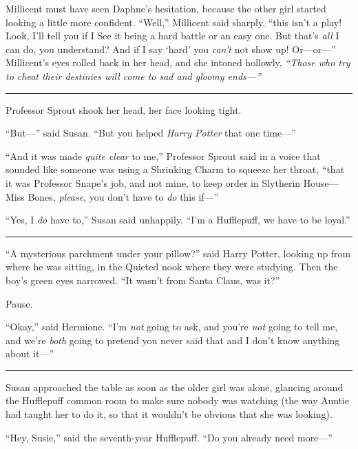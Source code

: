 Millicent must have seen Daphne's hesitation, because the other girl
started looking a little more confident. ``Well,'' Millicent said
sharply, ``this isn't a play! Look, I'll tell you if I See it being a
hard battle or an easy one. But that's \emph{all} I can do, you
understand? And if I say `hard' you \emph{can't} not show up!
Or---or---'' Millicent's eyes rolled back in her head, and she intoned
hollowly, \emph{``Those who try to cheat their destinies will come to
sad and gloomy ends---''}

\begin{center}\rule{3in}{0.4pt}\end{center}

Professor Sprout shook her head, her face looking tight.

``But---'' said Susan. ``But you helped \emph{Harry Potter} that one
time---''

``And it was made \emph{quite clear} to me,'' Professor Sprout said in a
voice that sounded like someone was using a Shrinking Charm to squeeze
her throat, ``that it was Professor Snape's job, and not mine, to keep
order in Slytherin House---Miss Bones, \emph{please}, you don't have to
\emph{do} this if---''

``Yes, I \emph{do} have to,'' Susan said unhappily. ``I'm a Hufflepuff,
we have to be loyal.''

\begin{center}\rule{3in}{0.4pt}\end{center}

``A mysterious parchment under your pillow?'' said Harry Potter, looking
up from where he was sitting, in the Quieted nook where they were
studying. Then the boy's green eyes narrowed. ``It wasn't from Santa
Claus, was it?''

Pause.

``Okay,'' said Hermione. ``I'm \emph{not} going to ask, and you're
\emph{not} going to tell me, and we're \emph{both} going to pretend you
never said that and I don't know anything about it---''

\begin{center}\rule{3in}{0.4pt}\end{center}

Susan approached the table as soon as the older girl was alone, glancing
around the Hufflepuff common room to make sure nobody was watching (the
way Auntie had taught her to do it, so that it wouldn't be obvious that
she was looking).

``Hey, Susie,'' said the seventh-year Hufflepuff. ``Do you already need
more---''

